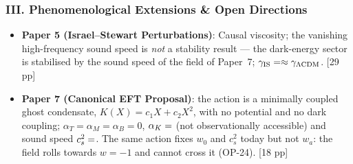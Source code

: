\documentclass[11pt,a4paper]{article}
\begin{document}
\subsubsection*{III. Phenomenological Extensions \& Open Directions}
\begin{itemize}
  \item \textbf{Paper 5 (Israel--Stewart Perturbations)}: Causal viscosity; the vanishing high-frequency sound speed is \emph{not} a stability result --- the dark-energy sector is stabilised by the sound speed of the field of Paper~7; $\gamma_{\rm IS}=\val{p3_gamma_IS}\approx\gamma_{\Lambda\rm CDM}$. [29 pp]
  \item \textbf{Paper 7 (Canonical EFT Proposal)}: the action is a minimally
  coupled ghost condensate, $K(X)=c_1X+c_2X^2$, with no potential and no dark
  coupling; $\alpha_T=\alpha_M=\alpha_B=0$, $\alpha_K=\val{alpha_K_z0_d6}$ (not
  observationally accessible) and sound speed $c_s^2=\val{cs2_condensado_d6}$. The same action
  fixes $w_0$ and $c_s^2$ today but not $w_a$: the field rolls towards $w=-1$ and cannot cross it (OP-24). [18 pp]
\end{itemize}
\end{document}
